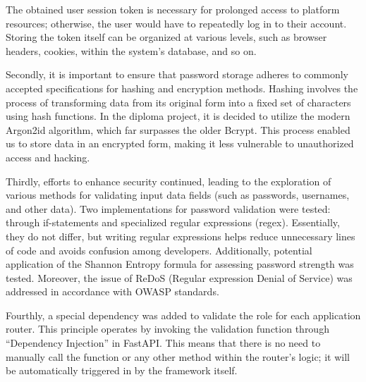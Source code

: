 The obtained user session token is necessary for prolonged access to platform resources; otherwise, the user would have to repeatedly log in to their account. Storing the token itself can be organized at various levels, such as browser headers, cookies, within the system's database, and so on.

Secondly, it is important to ensure that password storage adheres to commonly accepted specifications for hashing and encryption methods. Hashing involves the process of transforming data from its original form into a fixed set of characters using hash functions. In the diploma project, it is decided to utilize the modern Argon2id algorithm, which far surpasses the older Bcrypt. This process enabled us to store data in an encrypted form, making it less vulnerable to unauthorized access and hacking.

Thirdly, efforts to enhance security continued, leading to the exploration of various methods for validating input data fields (such as passwords, usernames, and other data). Two implementations for password validation were tested: through if-statements and specialized regular expressions (regex). Essentially, they do not differ, but writing regular expressions helps reduce unnecessary lines of code and avoids confusion among developers. Additionally, potential application of the Shannon Entropy formula for assessing password strength was tested. Moreover, the issue of ReDoS (Regular expression Denial of Service) was addressed in accordance with OWASP standards.

Fourthly, a special dependency was added to validate the role for each application router. This principle operates by invoking the validation function through ``Dependency Injection'' in FastAPI. This means that there is no need to manually call the function or any other method within the router's logic; it will be automatically triggered in by the framework itself.


